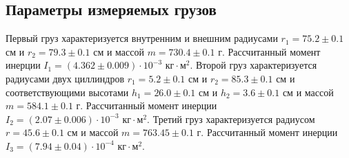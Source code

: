 \documentclass[12pt]{article}
\begin{document}
\subsection{Параметры измеряемых грузов} \label{app_3}
Первый груз характеризуется внутренним и внешним радиусами $r_1 = 75.2 \pm 0.1$ см и $r_2 = 79.3 \pm 0.1$ см и массой $m = 730.4 \pm 0.1$ г. Рассчитанный момент инерции $I_1 = (4.362 \pm 0.009)\cdot 10^{-3}\textrm{ кг}\cdot\textrm{м}^2$.
Второй груз характеризуется радиусами двух циллиндров $r_1 = 5.2 \pm 0.1$ см и $r_2 = 85.3 \pm 0.1$ см и соответствующими высотами $h_1 = 26.0 \pm 0.1$ см и $h_2 = 3.6 \pm 0.1$ см и массой $m = 584.1 \pm 0.1$ г. 
Рассчитанный момент инерции $I_2 = (2.07 \pm 0.006)\cdot 10^{-3}\textrm{ кг}\cdot\textrm{м}^2$.
Третий груз характеризуется радиусом $r = 45.6 \pm 0.1$ см и массой $m = 763.45 \pm 0.1$ г. Рассчитанный момент инерции $I_3 = (7.94 \pm 0.04) \cdot 10^{-4}\textrm{ кг}\cdot\textrm{м}^2$.
\end{document}
